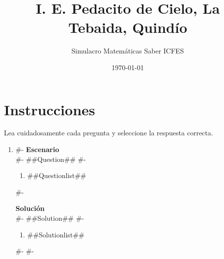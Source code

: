 \documentclass[a4paper,12pt]{article}
\title{I. E. Pedacito de Cielo, La Tebaida, Quindío}
\author{Simulacro Matemáticas Saber ICFES}
\date{\today}
\begin{document}
\maketitle

\section*{Instrucciones}

Lea cuidadosamente cada pregunta y seleccione la respuesta correcta.

\vspace{1em}

\begin{enumerate}[label=\arabic*.]
#-
  \item
#-
  \textbf{Escenario}\\
#-
  ##Question##
#-
  \begin{enumerate}[label=(\alph*)]
    \item ##Questionlist##
  \end{enumerate}
#-

  \textbf{Solución}\\
#-
  ##Solution##
#-
  \begin{enumerate}[label=(\alph*)]
    \item ##Solutionlist##
  \end{enumerate}
#-
#-
\end{enumerate}
\end{document}
